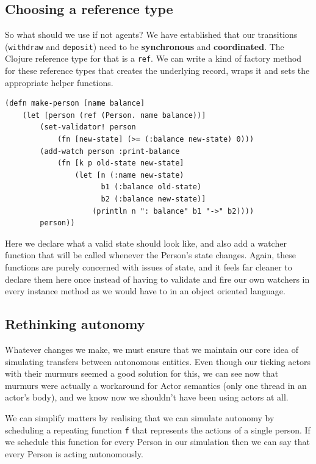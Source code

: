 \documentclass[a4paper,12pt]{kth-mag}
\begin{document}
\subsection{Choosing a reference type}

So what should we use if not agents? We have established that our transitions (\texttt{withdraw} and \texttt{deposit}) need to be \textbf{synchronous} and \textbf{coordinated}. The Clojure reference type for that is a \texttt{ref}. We can write a kind of factory method for these reference types that creates the underlying record, wraps it and sets the appropriate helper functions.

\begin{listing}[H]
	\begin{verbatim}
(defn make-person [name balance]
    (let [person (ref (Person. name balance))]
        (set-validator! person 
            (fn [new-state] (>= (:balance new-state) 0)))
        (add-watch person :print-balance
            (fn [k p old-state new-state] 
                (let [n (:name new-state)
                      b1 (:balance old-state)
                      b2 (:balance new-state)]
                    (println n ": balance" b1 "->" b2))))
        person))
	\end{verbatim}
\end{listing}

Here we declare what a valid state should look like, and also add a watcher function that will be called whenever the Person's state changes. Again, these functions are purely concerned with issues of state, and it feels far cleaner to declare them here once instead of having to validate and fire our own watchers in every instance method as we would have to in an object oriented language.

\subsection{Rethinking autonomy}

Whatever changes we make, we must ensure that we maintain our core idea of simulating transfers between autonomous entities. Even though our ticking actors with their murmurs seemed a good solution for this, we can see now that murmurs were actually a workaround for Actor semantics (only one thread in an actor's body), and we know now we shouldn't have been using actors at all.

We can simplify matters by realising that we can simulate autonomy by scheduling a repeating function \texttt{f} that represents the actions of a single person. If we schedule this function for every Person in our simulation then we can say that every Person is acting autonomously.
\end{document}
